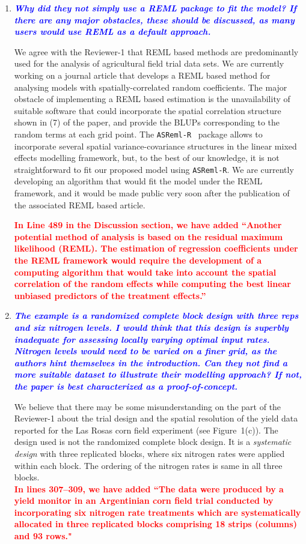 \documentclass[a4paper]{article}   	%
\newcommand{\asreml}{\texttt{ASReml-R}}
\newcommand{\qtitle}[1]{\textit{\textbf{#1}}}
\begin{document}
\begin{enumerate}
    \item \qtitle{\textcolor{blue}{Why did they not simply use a REML package to fit the model? If there are any major obstacles, these should be discussed, as many users would use REML as a default approach.}}
    
     We agree with the Reviewer-1 that REML based methods are predominantly used for the analysis of agricultural field trial data sets. We are currently working on a journal article that develops a REML based method for analysing models with spatially-correlated random coefficients. The major obstacle of implementing a REML based estimation is the unavailability of suitable software that could incorporate the spatial correlation structure shown in (7) of the paper, and provide the BLUPs corresponding to the random terms at each grid point. The \asreml  ~ package allows to incorporate several spatial variance-covariance structures in the linear mixed effects modelling framework, but, to the best of our knowledge, it is not straightforward to fit our proposed model using \asreml. We are currently developing an algorithm that would fit the model under the REML framework, and it would be made public very soon after the publication of the associated REML based article.
     
    \textcolor{red}{\textbf{In Line 489 in the Discussion section, we have added ``Another potential method of analysis is based on the residual maximum likelihood (REML). The estimation of regression coefficients under the REML framework would require the development of a computing algorithm that would take into account the spatial correlation of the random effects while computing the best linear unbiased predictors of the treatment effects.''}}
    
   
    
    \item \qtitle{\textcolor{blue}{The example is a randomized complete block design with three reps and six nitrogen levels. I would think that this design is superbly inadequate for assessing locally varying optimal input rates. Nitrogen levels would need to be varied on a finer grid, as the authors hint themselves in the introduction. Can they not find a more suitable dataset to illustrate their modelling approach? If not, the paper is best characterized as a proof-of-concept.}}
    
    We believe that there may be some misunderstanding on the part of the Reviewer-1 about the trial design and the spatial resolution of the yield data reported for the Las Rosas corn field experiment (see Figure~1(c)). The design used is not the randomized complete block design. It is a \emph{systematic design} with three replicated blocks, where six nitrogen rates were applied within each block. The ordering of the nitrogen rates is same in all three blocks. \\
    \textcolor{red}{\textbf{In lines 307--309, we have added ``The data were produced by a yield monitor in an Argentinian corn field trial conducted by incorporating six nitrogen rate treatments which are systematically allocated in three replicated blocks comprising 18 strips (columns) and 93 rows."}}
    

\end{enumerate}
\end{document}
